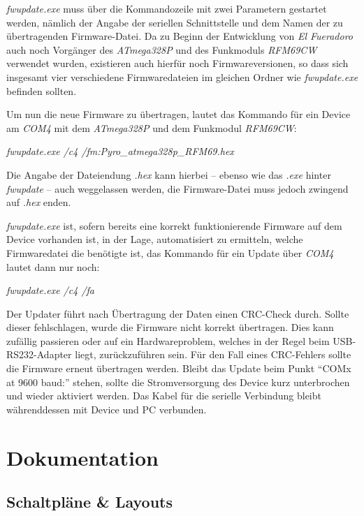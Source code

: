 \documentclass[pdftex, parskip, numbers=noenddot, toc=listof]{scrbook}
\newcommand{\anlage}{\emph{El Fueradoro}}
\begin{document}
	\emph{fwupdate.exe} muss über die Kommandozeile mit zwei Parametern gestartet werden, nämlich der Angabe der seriellen Schnittstelle und dem Namen der zu übertragenden Firmware-Datei. Da zu Beginn der Entwicklung von {\anlage} auch noch Vorgänger des \emph{ATmega328P} und des Funkmoduls \emph{RFM69CW} verwendet wurden, existieren auch hierfür noch Firmwareversionen, so dass sich insgesamt vier verschiedene Firmwaredateien im gleichen Ordner wie \emph{fwupdate.exe} befinden sollten.

	Um nun die neue Firmware zu übertragen, lautet das Kommando für ein Device am \emph{COM4} mit dem \emph{ATmega328P} und dem Funkmodul \emph{RFM69CW}:

	\begin{center}
		\emph{fwupdate.exe /c4 /fm:Pyro\_atmega328p\_RFM69.hex}
	\end{center}

	Die Angabe der Dateiendung \emph{.hex} kann hierbei -- ebenso wie das \emph{.exe} hinter \emph{fwupdate} -- auch weggelassen werden, die Firmware-Datei muss jedoch zwingend auf \emph{.hex} enden.

	\emph{fwupdate.exe} ist, sofern bereits eine korrekt funktionierende Firmware auf dem Device vorhanden ist, in der Lage, automatisiert zu ermitteln, welche Firmwaredatei die benötigte ist, das Kommando für ein Update über \emph{COM4} lautet dann nur noch:

	\begin{center}
		\emph{fwupdate.exe /c4 /fa}
	\end{center}

	Der Updater führt nach Übertragung der Daten einen CRC-Check durch. Sollte dieser fehlschlagen, wurde die Firmware nicht korrekt übertragen. Dies kann zufällig passieren oder auf ein Hardwareproblem, welches in der Regel beim USB-RS232-Adapter liegt, zurückzuführen sein. Für den Fall eines CRC-Fehlers sollte die Firmware erneut übertragen werden. Bleibt das Update beim Punkt \enquote{COMx at 9600 baud:} stehen, sollte die Stromversorgung des Device kurz unterbrochen und wieder aktiviert werden. Das Kabel für die serielle Verbindung bleibt währenddessen mit Device und PC verbunden.

	\part{Dokumentation}
	\label{part:dokumentation}

	\chapter{Schaltpläne \& Layouts}
\end{document}
